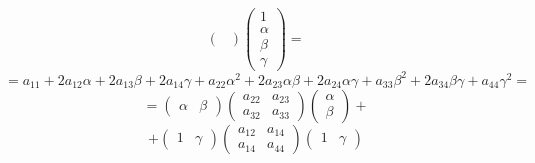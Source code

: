 \documentclass[pdftex,ptm,12pt,a4paper]{report}
\begin{document}
\begin{enumerate}
\[\begin{pmatrix}
        \end{pmatrix}
        \begin{pmatrix} 1 \\ \alpha \\ \beta \\ \gamma \end{pmatrix}  = 
    \]\[
        = a_{11} + 2a_{12}\alpha + 2a_{13}\beta + 2a_{14}\gamma + 
                 a_{22}\alpha^2 + 2a_{23}\alpha\beta + 2a_{24}\alpha\gamma + 
                                  a_{33}\beta^2 + 2a_{34}\beta\gamma + 
                                                  a_{44}\gamma^2  = 
    \]\[
        = \begin{pmatrix} \alpha & \beta \end{pmatrix} 
          \begin{pmatrix} 
              a_{22} & a_{23} \\ 
              a_{32} & a_{33} 
        \end{pmatrix}
        \begin{pmatrix} \alpha \\ \beta \end{pmatrix} + 
    \]\[
      + \begin{pmatrix} 1 & \gamma \end{pmatrix} 
          \begin{pmatrix} 
              a_{12} & a_{14} \\ 
              a_{14} & a_{44} 
        \end{pmatrix}
        \begin{pmatrix} 1 & \gamma \end{pmatrix}
    \]


\end{enumerate}
\end{document}
